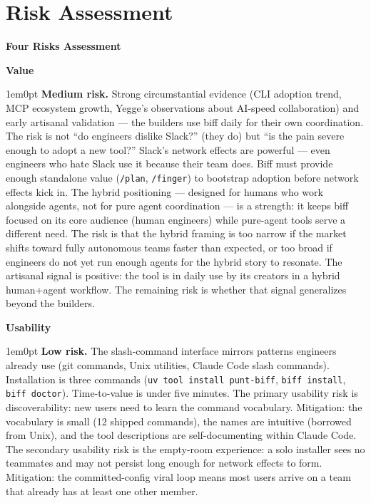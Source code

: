 \documentclass[11pt,letterpaper]{article}
\newcommand{\riskitem}[2]{%
  \vspace{0.4em}%
  \noindent\textbf{\color{SectionBlue}#1}\par%
  \vspace{0.1em}%
  \begin{adjustwidth}{1em}{0pt}%
    #2%
  \end{adjustwidth}%
}
\begin{document}
\section*{Risk Assessment}

\begin{mdframed}[
  linewidth=0.5pt,
  linecolor=QuoteBorder,
  backgroundcolor=BoxBg,
  innerleftmargin=10pt,
  innerrightmargin=10pt,
  innertopmargin=10pt,
  innerbottommargin=10pt,
  nobreak=true,
]
\small
{\bfseries\color{SectionBlue}Four Risks Assessment}\par
\vspace{0.5em}

\riskitem{Value}{%
  \textbf{Medium risk.} Strong circumstantial evidence (CLI adoption trend,
  MCP ecosystem growth, Yegge's observations about AI-speed collaboration)
  and early artisanal validation --- the builders use biff daily for their
  own coordination. The risk is not ``do engineers dislike Slack?'' (they do)
  but ``is the pain severe enough to adopt a new tool?'' Slack's network
  effects are powerful --- even engineers who hate Slack use it because their
  team does. Biff must provide enough standalone value (\texttt{/plan},
  \texttt{/finger}) to bootstrap adoption before network effects kick in.
  The hybrid positioning --- designed for humans who work alongside agents,
  not for pure agent coordination --- is a strength: it keeps biff focused
  on its core audience (human engineers) while pure-agent tools serve a
  different need. The risk is that the hybrid framing is too narrow if the
  market shifts toward fully autonomous teams faster than expected, or too
  broad if engineers do not yet run enough agents for the hybrid story to
  resonate. The artisanal signal is positive: the tool is in daily use by
  its creators in a hybrid human+agent workflow. The remaining risk is
  whether that signal generalizes beyond the builders.}

\riskitem{Usability}{%
  \textbf{Low risk.} The slash-command interface mirrors patterns engineers
  already use (git commands, Unix utilities, Claude Code slash commands).
  Installation is three commands (\texttt{uv tool install punt-biff},
  \texttt{biff install}, \texttt{biff doctor}). Time-to-value is under five
  minutes. The primary usability risk is discoverability: new users need to
  learn the command vocabulary. Mitigation: the vocabulary is small (12
  shipped commands), the names are intuitive (borrowed from Unix), and the
  tool descriptions are self-documenting within Claude Code. The secondary
  usability risk is the empty-room experience: a solo installer sees no
  teammates and may not persist long enough for network effects to form.
  Mitigation: the committed-config viral loop means most users arrive
  on a team that already has at least one other member.}


\end{mdframed}
\end{document}
